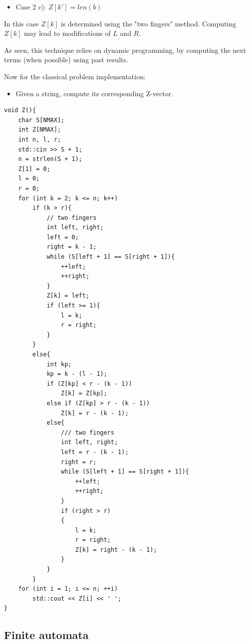 \documentclass[letterpaper]{article}
\begin{document}
\begin{itemize}
    \item Case 2 c): $Z[k'] = len(b)$
\end{itemize}

In this case $Z[k]$ is determined using the "two fingers" method. Computing $Z[k]$ may lead to modifications of $L$ and $R$.

As seen, this technique relies on dynamic programming, by computing the next terms (when possible) using past results.

Now for the classical problem implementation:


\begin{itemize}
    \item Given a string, compute its corresponding Z-vector.
\end{itemize}

\begin{lstlisting}
void Z(){
    char S[NMAX];
    int Z[NMAX];
    int n, l, r;
    std::cin >> S + 1;
    n = strlen(S + 1);
    Z[1] = 0;
    l = 0;
    r = 0;
    for (int k = 2; k <= n; k++)
        if (k > r){
            // two fingers
            int left, right;
            left = 0;
            right = k - 1;
            while (S[left + 1] == S[right + 1]){
                ++left;
                ++right;
            }
            Z[k] = left;
            if (left >= 1){
                l = k;
                r = right;
            }
        }
        else{
            int kp;
            kp = k - (l - 1);
            if (Z[kp] < r - (k - 1))
                Z[k] = Z[kp];
            else if (Z[kp] > r - (k - 1))
                Z[k] = r - (k - 1);
            else{
                /// two fingers
                int left, right;
                left = r - (k - 1);
                right = r;
                while (S[left + 1] == S[right + 1]){
                    ++left;
                    ++right;
                }
                if (right > r)
                {
                    l = k;
                    r = right;
                    Z[k] = right - (k - 1);
                }
            }
        }
    for (int i = 1; i <= n; ++i)
        std::cout << Z[i] << ' ';
}
\end{lstlisting}


\newpage

\subsection{Finite automata}
\end{document}
